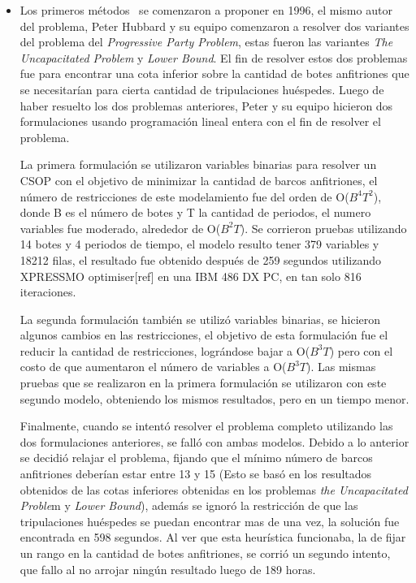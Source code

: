 \documentclass[spanish, fleqn]{article}
\begin{document}
\begin{itemize}
\item Los primeros métodos~\cite{Smith1996} se comenzaron a proponer en 1996, el mismo autor del problema, Peter Hubbard y su equipo comenzaron a resolver dos variantes del problema del \textit{Progressive Party Problem}, estas fueron las variantes \textit{The Uncapacitated Problem} y \textit{Lower Bound}. El fin de resolver estos dos problemas fue para encontrar una cota inferior sobre la cantidad de botes anfitriones que se necesitarían para cierta cantidad de tripulaciones huéspedes.
Luego de haber resuelto los dos problemas anteriores, Peter y su equipo hicieron dos formulaciones usando programación lineal entera con el fin de resolver el problema. 

La primera formulación se utilizaron variables binarias para resolver un CSOP con el objetivo de minimizar la cantidad de barcos anfitriones, el número de restricciones de este modelamiento fue del orden de O($B^{4}T^{2}$), donde B es el número de botes y T la cantidad de periodos, el numero variables fue moderado, alrededor de O($B^{2}T$). Se corrieron pruebas utilizando 14 botes y 4 periodos de tiempo, el modelo resulto tener 379 variables y 18212 filas, el resultado fue obtenido después de 259 segundos utilizando XPRESSMO optimiser[ref] en una IBM 486 DX PC, en tan solo 816 iteraciones.

La segunda formulación también se utilizó variables binarias, se hicieron algunos cambios en las restricciones, el objetivo de esta formulación fue el reducir la cantidad de restricciones, lográndose bajar a O($B^{3}T$) pero con el costo de que aumentaron el número de variables a O($B^{3}T$). Las mismas pruebas que se realizaron en la primera formulación se utilizaron con este segundo modelo, obteniendo los mismos resultados, pero en un tiempo menor.

Finalmente, cuando se intentó resolver el problema completo utilizando las dos formulaciones anteriores, se falló con ambas modelos. Debido a lo anterior se decidió relajar el problema, fijando que el mínimo número de barcos anfitriones deberían estar entre 13 y 15 (Esto se basó en los resultados obtenidos de las cotas inferiores obtenidas en los problemas \textit{the Uncapacitated Proble}m y \textit{Lower Bound}), además se ignoró la restricción de que las tripulaciones huéspedes se puedan encontrar mas de una vez, la solución fue encontrada en 598 segundos. Al ver que esta heurística funcionaba, la de fijar un rango en la cantidad de botes anfitriones, se corrió un segundo intento, que fallo al no arrojar ningún resultado luego de 189 horas.


\end{itemize}
\end{document}
